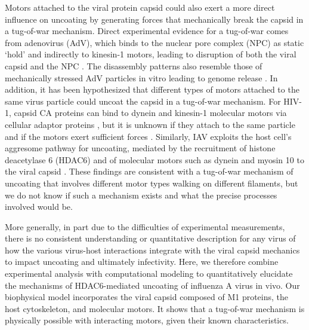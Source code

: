 Motors attached to the viral protein capsid could also exert a more direct influence on uncoating by generating forces that mechanically break the capsid in a tug-of-war mechanism. Direct experimental evidence for a tug-of-war comes from adenovirus (AdV), which binds to the nuclear pore complex (NPC) as static ‘hold’ and indirectly to kinesin-1 motors, leading to disruption of both the viral capsid and the NPC \cite{greber2019adenovirus, strunze2011kinesin}. The disassembly patterns also resemble those of mechanically stressed AdV particles in vitro leading to genome release \cite{ortega2015fluorescence, ortega2013monitoring}. In addition, it has been hypothesized that different types of motors attached to the same virus particle could uncoat the capsid in a tug-of-war mechanism. For HIV-1, capsid CA proteins can bind to dynein and kinesin-1 molecular motors via cellular adaptor proteins \cite{carnes2018hiv, lukic2014hiv, malikov2017localized}, but it is unknown if they attach to the same particle and if the motors exert sufficient forces \cite{malikov2017localized}. Similarly, IAV exploits the host cell’s aggresome pathway for uncoating, mediated by the recruitment of histone deacetylase 6 (HDAC6) and of molecular motors such as dynein and myosin 10 to the viral capsid \cite{banerjee2014influenza}. These findings are consistent with a tug-of-war mechanism of uncoating that involves different motor types walking on different filaments, but we do not know if such a mechanism exists and what the precise processes involved would be.

More generally, in part due to the difficulties of experimental measurements, there is no consistent understanding or quantitative description for any virus of how the various virus-host interactions integrate with the viral capsid mechanics to impact uncoating and ultimately infectivity. Here, we therefore combine experimental analysis with computational modeling to quantitatively elucidate the mechanisms of HDAC6-mediated uncoating of influenza A virus in vivo. Our biophysical model incorporates the viral capsid composed of M1 proteins, the host cytoskeleton, and molecular motors. It shows that a tug-of-war mechanism is physically possible with interacting motors, given their known characteristics.
